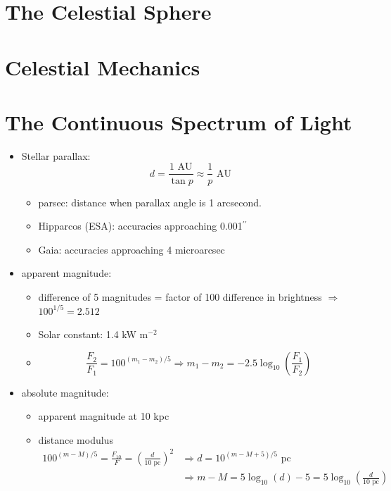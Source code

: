 \documentclass[12pt]{article}
\begin{document}
\section{The Celestial Sphere}

\section{Celestial Mechanics}

\section{The Continuous Spectrum of Light}
\begin{itemize}
\item Stellar parallax: 
\begin{equation}
d = \frac{1\text{ AU}}{\tan p} \approx \frac{1}{p}\text{ AU}
\end{equation}
\begin{itemize}
\item parsec: distance when parallax angle is 1 arcsecond.
\item Hipparcos (ESA): accuracies approaching 0.001$^{\prime\prime}$
\item Gaia: accuracies approaching 4 microarcsec
\end{itemize}
\item apparent magnitude:
\begin{itemize}
\item difference of 5 magnitudes = factor of 100 difference in brightness $\Longrightarrow$ $100^{1/5} = 2.512$
\item Solar constant: 1.4 kW m$^{-2}$
\item
\begin{equation}
\frac{F_2}{F_1} = 100^{(m_1-m_2)/5} \Longrightarrow m_1 - m_2 = -2.5\log_{10}\left(\frac{F_1}{F_2}\right)
\end{equation}
\end{itemize}
\item absolute magnitude:
\begin{itemize}
\item apparent magnitude at 10 kpc
\item distance modulus
\begin{align*}
100^{(m - M)/5} = \frac{F_{10}}{F} = \left(\frac{d}{10\text{ pc}}\right)^2 &\Longrightarrow d = 10^{(m - M + 5)/5}\text{ pc} \\
&\Longrightarrow m - M = 5\log_{10}(d) - 5 = 5\log_{10}\left(\frac{d}{10\text{ pc}}\right)

\end{align*}
\end{itemize}
\end{itemize}
\end{document}
